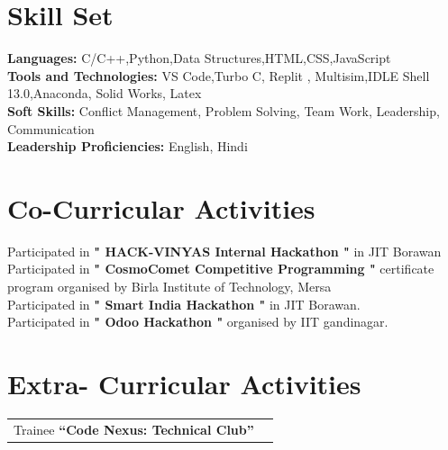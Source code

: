 \documentclass[a4paper,11pt]{article}
\begin{document}
\section{Skill Set}
\textbf{Languages:} C/C++,Python,Data Structures,HTML,CSS,JavaScript\\
\textbf{Tools and Technologies:} VS Code,Turbo C, Replit , Multisim,IDLE Shell 13.0,Anaconda, Solid Works, Latex \\
\textbf{Soft Skills:} Conflict Management, Problem Solving, Team Work, Leadership, Communication \\
\textbf{Leadership Proficiencies:} English, Hindi \\[-1.5em]




\section{Co-Curricular Activities}
Participated in \textbf{" HACK-VINYAS Internal Hackathon "} in JIT Borawan \\
Participated in \textbf{" CosmoComet Competitive Programming " }certificate program organised by Birla Institute of Technology, Mersa \\ 
Participated in\textbf{ " Smart India Hackathon "} in JIT Borawan. \\ 
Participated in \textbf{" Odoo Hackathon "} organised by IIT gandinagar. \\

\vspace{-14pt}




\section{Extra- Curricular Activities}
\begin{tabularx}{\linewidth}{@{}l X@{}}
 Trainee \textbf{“Code Nexus: Technical Club”} \\ 

\end{tabularx}
\end{document}
